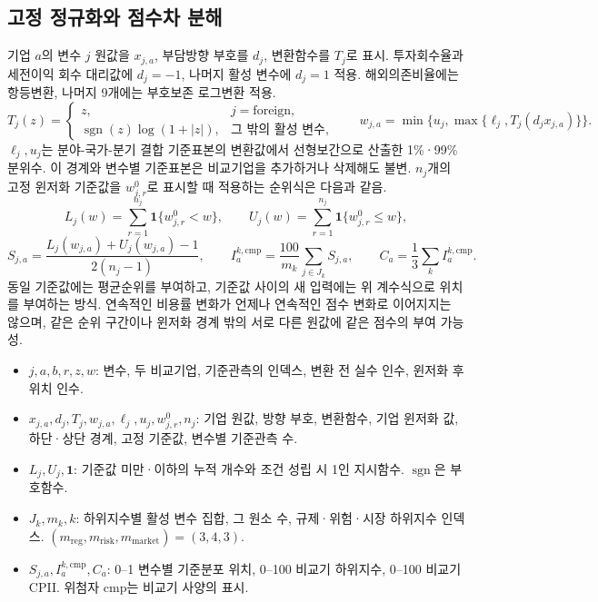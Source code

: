 \subsection*{고정 정규화와 점수차 분해}
기업 \(a\)의 변수 \(j\) 원값을 \(x_{j,a}\), 부담방향 부호를 \(d_j\), 변환함수를 \(T_j\)로 표시. 투자회수율과 세전이익 회수 대리값에 \(d_j=-1\), 나머지 활성 변수에 \(d_j=1\) 적용. 해외의존비율에는 항등변환, 나머지 9개에는 부호보존 로그변환 적용.
\[
T_j(z)=
\begin{cases}
z,&j=\mathrm{foreign},\\
\operatorname{sgn}(z)\log(1+|z|),&\text{그 밖의 활성 변수},
\end{cases}
\qquad
w_{j,a}=\min\{u_j,\max\{\ell_j,T_j(d_jx_{j,a})\}\}.
\]
\(\ell_j,u_j\)는 분야-국가-분기 결합 기준표본의 변환값에서 선형보간으로 산출한 1\%·99\% 분위수. 이 경계와 변수별 기준표본은 비교기업을 추가하거나 삭제해도 불변. \(n_j\)개의 고정 윈저화 기준값을 \(w^0_{j,r}\)로 표시할 때 적용하는 순위식은 다음과 같음.
\[
L_j(w)=\sum_{r=1}^{n_j}\mathbf1\{w^0_{j,r}<w\},\qquad
U_j(w)=\sum_{r=1}^{n_j}\mathbf1\{w^0_{j,r}\leq w\},
\]
\[
S_{j,a}=\frac{L_j(w_{j,a})+U_j(w_{j,a})-1}{2(n_j-1)},
\qquad
I^{k,\mathrm{cmp}}_a=\frac{100}{m_k}\sum_{j\in J_k}S_{j,a},
\qquad
C_a=\frac13\sum_k I^{k,\mathrm{cmp}}_a.
\]
동일 기준값에는 평균순위를 부여하고, 기준값 사이의 새 입력에는 위 계수식으로 위치를 부여하는 방식. 연속적인 비용률 변화가 언제나 연속적인 점수 변화로 이어지지는 않으며, 같은 순위 구간이나 윈저화 경계 밖의 서로 다른 원값에 같은 점수의 부여 가능성.

\begin{itemize}[leftmargin=1.8em,itemsep=0.3em]
\item \(j,a,b,r,z,w\): 변수, 두 비교기업, 기준관측의 인덱스, 변환 전 실수 인수, 윈저화 후 위치 인수.
\item \(x_{j,a},d_j,T_j,w_{j,a},\ell_j,u_j,w^0_{j,r},n_j\): 기업 원값, 방향 부호, 변환함수, 기업 윈저화 값, 하단·상단 경계, 고정 기준값, 변수별 기준관측 수.
\item \(L_j,U_j,\mathbf1\): 기준값 미만·이하의 누적 개수와 조건 성립 시 1인 지시함수. \(\operatorname{sgn}\)은 부호함수.
\item \(J_k,m_k,k\): 하위지수별 활성 변수 집합, 그 원소 수, 규제·위험·시장 하위지수 인덱스. \((m_{\mathrm{reg}},m_{\mathrm{risk}},m_{\mathrm{market}})=(3,4,3)\).
\item \(S_{j,a},I^{k,\mathrm{cmp}}_a,C_a\): 0--1 변수별 기준분포 위치, 0--100 비교기 하위지수, 0--100 비교기 CPII. 위첨자 \(\mathrm{cmp}\)는 비교기 사양의 표시.
\end{itemize}

